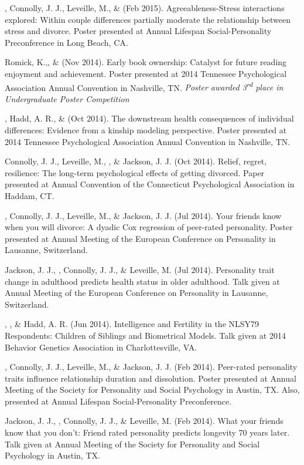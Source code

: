 \begin{etaremune}
%
\item\meb, Connolly, J. J., Leveille, M., \& \jjj (Feb 2015). Agreeableness-Stress interactions explored: Within couple differences partially moderate the relationship between stress and divorce. Poster presented at Annual Lifespan Social-Personality Preconference in Long Beach, CA.
%
\item Romick, K.,\noteA \meb, \& \joe (Nov 2014). Early book ownership: Catalyst for future reading enjoyment and achievement. Poster presented at 2014 Tennessee Psychological Association Annual Convention in  Nashville, TN. \textit{Poster awarded 3\textsuperscript{rd} place in Undergraduate Poster Competition}
%
\item\meb, Hadd, A. R., \& \joe (Oct 2014). The downstream health consequences of individual differences: Evidence from a kinship modeling perspective. Poster presented at 2014 Tennessee Psychological Association Annual Convention in Nashville, TN.
%
\item Connolly, J. J., Leveille, M., \meb, \& Jackson, J. J. (Oct 2014). Relief, regret, resilience: The long-term psychological effects of getting divorced. Paper presented at Annual Convention of the Connecticut Psychological Association in Haddam, CT.
%
\item\meb, Connolly, J. J., Leveille, M., \& Jackson, J. J. (Jul 2014). Your friends know when you will divorce: A dyadic Cox regression of peer-rated personality. Poster presented at Annual Meeting of the European Conference on Personality in Lausanne, Switzerland.
%
\item Jackson, J. J., \meb, Connolly, J. J., \& Leveille, M. (Jul 2014). Personality trait change in adulthood predicts health status in older adulthood. Talk given at Annual Meeting of the European Conference on Personality in Lausanne, Switzerland.
%
\item \joe, \meb, \& Hadd, A. R. (Jun 2014). Intelligence and Fertility in the NLSY79 Respondents: Children of Siblings and Biometrical Models. Talk given at 2014 Behavior Genetics Association in Charlottesville, VA.
%
\item\meb, Connolly, J. J., Leveille, M., \& Jackson, J. J. (Feb 2014). Peer-rated personality traits influence relationship duration and dissolution. Poster presented at Annual Meeting of the Society for Personality and Social Psychology in Austin, TX. Also, presented at Annual Lifespan Social-Personality Preconference.
%
\item Jackson, J. J., \meb, Connolly, J. J., \& Leveille, M. (Feb 2014). What your friends know that you don't: Friend rated personality predicts longevity 70 years later. Talk given at Annual Meeting of the Society for Personality and Social Psychology in Austin, TX.
%
\end{etaremune}\newline

